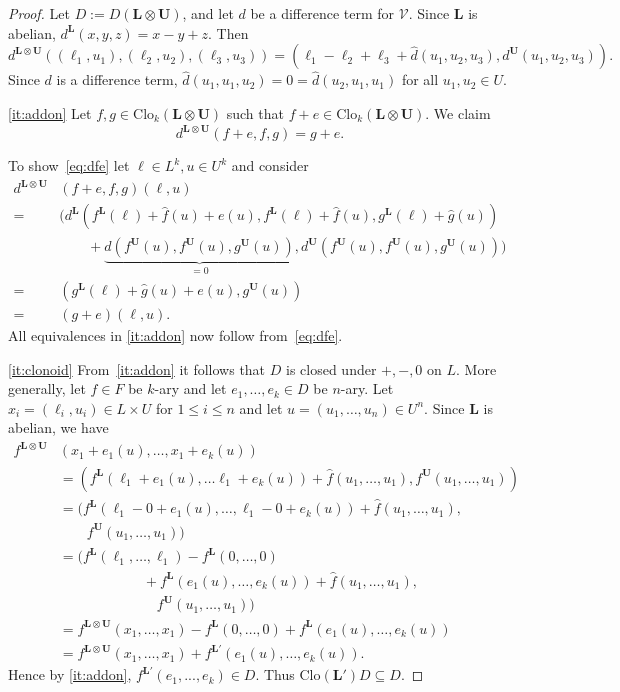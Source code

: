 \documentclass[10pt,a4paper]{amsart}
\numberwithin{equation}{section}
\renewcommand{\L}{\mathbf{L}}
\newcommand{\U}{\mathbf{U}}
\newcommand{\V}{\mathcal{V}}
\newcommand{\Clo}{\mathrm{Clo}}
\begin{document}
\begin{proof}
  Let $D := D(\L\otimes\U)$, and let $d$ be a difference term for $\V$.
  Since $\L$ is abelian, $d^\L(x,y,z) = x-y+z$.
  Then \[d^{\L \otimes \U}((\ell_1,u_1),(\ell_2,u_2),(\ell_3,u_3)) = (\ell_1-\ell_2+\ell_3 + \hat{d}(u_1,u_2,u_3), d^\U(u_1,u_2,u_3)).\]
  Since $d$ is a difference term, $\hat{d}(u_1,u_1,u_2) = 0 = \hat{d}(u_2,u_1,u_1)$ for all $u_1,u_2\in U$.

  \eqref{it:addon}
    Let $f,g\in\Clo_k(\L\otimes\U)$ such that $f+e\in\Clo_k(\L\otimes\U)$. 
    We claim 
      \begin{equation} \label{eq:dfe}
        d^{\L\otimes\U}(f+e,f,g) = g+e.
      \end{equation}

  To show~\eqref{eq:dfe} let $\ell\in L^k,u\in U^k$ and consider 
    \begin{align*}
      d^{\L\otimes\U}&(f+e,f,g) (\ell,u)  \\
      = & (d^\L(f^\L(\ell)+\hat{f}(u)+e(u),f^\L(\ell)+\hat{f}(u),g^\L(\ell)+\hat{g}(u)) \\
      & \quad \quad +\underbrace{\hat{d}(f^\U(u),f^\U(u),g^\U(u))}_{=0},  d^\U(f^\U(u),f^\U(u),g^\U(u)) ) \\
      = & (g^\L(\ell)+\hat{g}(u)+e(u), g^\U(u)) \\
      =  & (g+e)(\ell,u). 
    \end{align*}
  All equivalences in \eqref{it:addon} now follow from~\eqref{eq:dfe}.


  \eqref{it:clonoid}
    From~\eqref{it:addon} it follows that $D$ is closed under $+,-,0$ on $L$. 
    More generally, let $f\in F$ be $k$-ary  and
      let $e_1,\dots,e_k\in D$ be $n$-ary. 
    Let $x_i = (\ell_i, u_i) \in L \times U$ for $1 \le i \le n$ and let $u = (u_1, \dots, u_n) \in U^n$.
    Since $\L$ is abelian, we have
    \begin{align*}
      f^{\L\otimes \U} & (x_1+e_1(u), \dots, x_1 +e_k(u)) \\
      &= ( f^\L(\ell_1 + e_1(u), \dots \ell_1 + e_k(u)) + \hat{f}(u_1, \dots, u_1) , f^\U(u_1, \dots, u_1) ) \\
      & =  ( f^\L(\ell_1 - 0 + e_1(u), \dots , \ell_1 - 0 + e_k(u)) + \hat{f}(u_1, \dots, u_1) , \\
      & \quad \quad f^\U(u_1, \dots, u_1) ) \\ 
      & = ( f^\L(\ell_1, \dots, \ell_1) - f^\L(0, \dots, 0)  \\
      & \hspace{1in}+ f^\L(e_1(u), \dots, e_k(u)) + \hat{f}(u_1, \dots, u_1), \\
      & \quad \quad \quad \quad \quad \quad \quad f^\U(u_1, \dots, u_1))\\
      & =  f^{\L\otimes \U} (x_1, \dots, x_1) - f^\L(0, \dots, 0) + f^\L(e_1(u), \dots, e_k(u)) \\
      &  = f^{\L\otimes \U} (x_1, \dots, x_1)  +f^{\L'} (e_1(u), \dots ,e_k(u)).
    \end{align*}
  Hence by \eqref{it:addon},
    $f^{\L'} (e_1,...,e_k) \in D$.
  Thus $\Clo(\L')D \subseteq D$.


\end{proof}
\end{document}
